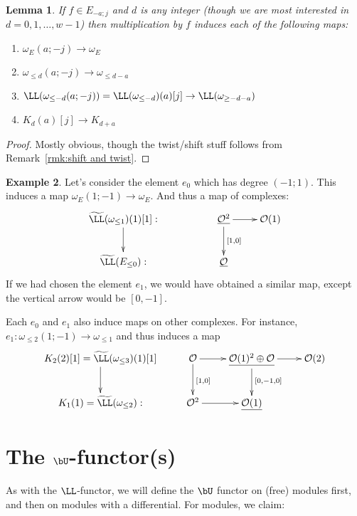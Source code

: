 \documentclass[12pt]{amsart}
\newtheorem{lemma}{Lemma}[section]
\theoremstyle{definition}
\newtheorem{example}[lemma]{Example}
\theoremstyle{remark}
\newcommand{\cO}{{\mathcal O}}
\begin{document}
\begin{lemma}
If $f\in E_{-a;j}$ and $d$ is any integer (though we are most interested in $d=0,1,\dots,w-1$) then multiplication by $f$ induces each of the following maps:
\begin{enumerate}
	\item  $\omega_E(a;-j)\to \omega_E$ 
	\item  $\omega_{\leq d}(a;-j) \to \omega_{\leq d-a}$
	\item $\LL(\omega_{\leq -d}(a;-j))=\LL(\omega_{\leq -d})(a)[j] \to \LL(\omega_{\geq -d-a})$
	\item $K_d(a)[j] \to K_{d+a}$
\end{enumerate}
\end{lemma}
\begin{proof}
Mostly obvious, though the twist/shift stuff follows from Remark~\ref{rmk:shift and twist}.
\end{proof}

\begin{example}
Let's consider the element $e_0$ which has degree $(-1;1)$.  This induces a map $\omega_E(1;-1)\to \omega_E$. And thus a map of complexes:
\begin{equation}\label{eqn:e0}
\xymatrix{
\widetilde{\LL}(\omega_{\leq 1})(1)[1]:\ar[d]&&\underline{\cO^2} \ar[r]\ar[d]^{[1,0]}&\cO(1)\\
\widetilde{\LL}(E_{\leq 0}):&&\underline{\cO}&
}
\end{equation}
If we had chosen the element $e_1$, we would have obtained a similar map, except the vertical arrow would be $[0,-1]$.


Each $e_0$ and $e_1$ also induce maps on other complexes.  For instance, $e_1: \omega_{\leq 2}(1;-1) \to \omega_{\leq 1}$ and thus induces a map
\begin{equation}\label{eqn:e1}
\xymatrix{
K_2(2)[1]=\widetilde{\LL}(\omega_{\leq 3})(1)[1]\ar[d]:&\cO\ar[r]\ar[d]^{[1,0]}&\underline{\cO(1)^2\oplus \cO} \ar[r]\ar[d]^{[0,-1,0]}&\cO(2) \\
K_1(1) = \widetilde{\LL}(\omega_{\leq 2}):&\cO^2 \ar[r]&\underline{\cO(1)}&
}
\end{equation}
\end{example}

\section{The $\bU$-functor(s)}
As with the $\LL$-functor, we will define the $\bU$ functor on (free) modules first, and then on modules with a differential.  For modules, we claim:
\end{document}
